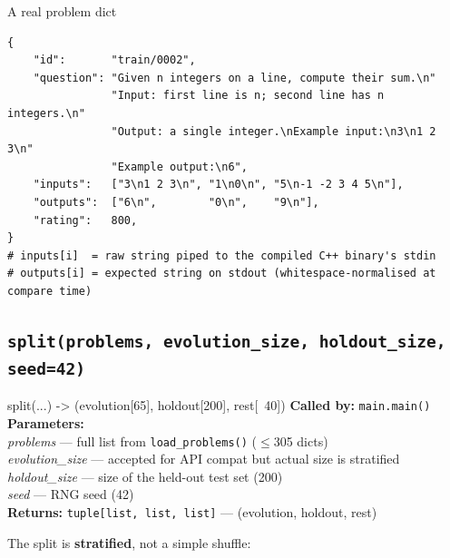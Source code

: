 \documentclass[11pt,a4paper]{report}
\newcommand{\fn}[1]{\texttt{#1}}
\newcommand{\param}[1]{\textit{#1}}
\begin{document}
\begin{exbox}{A real problem dict}
\begin{lstlisting}[style=example]
{
    "id":       "train/0002",
    "question": "Given n integers on a line, compute their sum.\n"
                "Input: first line is n; second line has n integers.\n"
                "Output: a single integer.\nExample input:\n3\n1 2 3\n"
                "Example output:\n6",
    "inputs":   ["3\n1 2 3\n", "1\n0\n", "5\n-1 -2 3 4 5\n"],
    "outputs":  ["6\n",        "0\n",    "9\n"],
    "rating":   800,
}
# inputs[i]  = raw string piped to the compiled C++ binary's stdin
# outputs[i] = expected string on stdout (whitespace-normalised at compare time)
\end{lstlisting}
\end{exbox}

\subsection{\fn{split(problems, evolution\_size, holdout\_size, seed=42)}}

\begin{specbox}{split(...) -> (evolution[65], holdout[200], rest[~40])}
\textbf{Called by:} \fn{main.main()}\\
\textbf{Parameters:}\\
\hspace{1em}\param{problems} --- full list from \fn{load\_problems()} ($\leq$305 dicts)\\
\hspace{1em}\param{evolution\_size} --- accepted for API compat but actual size is stratified\\
\hspace{1em}\param{holdout\_size} --- size of the held-out test set (200)\\
\hspace{1em}\param{seed} --- RNG seed (42)\\
\textbf{Returns:} \texttt{tuple[list, list, list]} --- (evolution, holdout, rest)
\end{specbox}

The split is \textbf{stratified}, not a simple shuffle:
\end{document}
